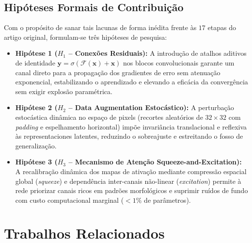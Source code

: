\documentclass[runningheads]{llncs}
\begin{document}
\subsection{Hip\'{o}teses Formais de Contribui\c{c}\~{a}o}
Com o prop\'{o}sito de sanar tais lacunas de forma in\'{e}dita frente \`{a}s $17$ etapas do artigo original, formulam-se tr\^{e}s hip\'{o}teses de pesquisa:
\begin{itemize}
    \item \textbf{Hip\'{o}tese 1 ($H_1$ -- Conex\~{o}es Residuais):} A introdu\c{c}\~{a}o de atalhos aditivos de identidade $\mathbf{y} = \sigma(\mathcal{F}(\mathbf{x}) + \mathbf{x})$ nos blocos convolucionais garante um canal direto para a propaga\c{c}\~{a}o dos gradientes de erro sem atenua\c{c}\~{a}o exponencial, estabilizando o aprendizado e elevando a efic\'{a}cia da converg\^{e}ncia sem exigir explos\~{a}o param\'{e}trica.
    \item \textbf{Hip\'{o}tese 2 ($H_2$ -- Data Augmentation Estoc\'{a}stico):} A perturba\c{c}\~{a}o estoc\'{a}stica din\^{a}mica no espa\c{c}o de pixels (recortes aleat\'{o}rios de $32 \times 32$ com \textit{padding} e espelhamento horizontal) imp\~{o}e invari\^{a}ncia translacional e reflexiva \`{a}s representaciones latentes, reduzindo o sobreajuste e estreitando o fosso de generaliza\c{c}\~{a}o.
    \item \textbf{Hip\'{o}tese 3 ($H_3$ -- Mecanismo de Aten\c{c}\~{a}o Squeeze-and-Excitation):} A recalibra\c{c}\~{a}o din\^{a}mica dos mapas de ativa\c{c}\~{a}o mediante compress\~{a}o espacial global (\textit{squeeze}) e depend\^{e}ncia inter-canais n\~{a}o-linear (\textit{excitation}) permite \`{a} rede priorizar canais ricos em padr\~{o}es morfol\'{o}gicos e suprimir ru\'{i}dos de fundo com custo computacional marginal ($< 1\%$ de par\^{a}metros).
\end{itemize}

\section{Trabalhos Relacionados}
\label{sec:related}
\end{document}
